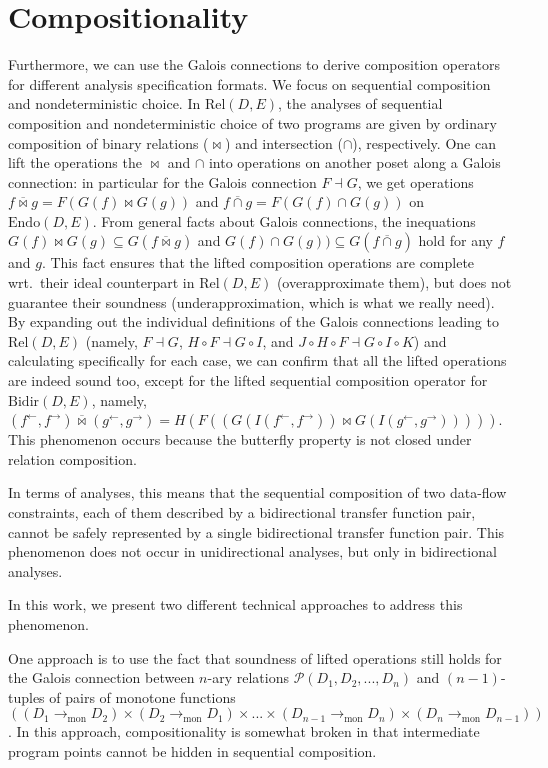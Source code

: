 \documentclass{easychair}
\theoremstyle{definition}
\newcommand{\Pow}{\mathcal{P}}
\newcommand{\Rel}{\mathrm{Rel}}
\newcommand{\Endo}{\mathrm{Endo}}
\newcommand{\Bidir}{\mathrm{Bidir}}
\newcommand{\tomon}{\to_{\mathrm{mon}}}
\newcommand{\ff}{{f^{\rightarrow}}}
\newcommand{\fb}{{f^{\leftarrow}}}
\newcommand{\gf}{{g^{\rightarrow}}}
\newcommand{\gb}{{g^{\leftarrow}}}
\newcommand{\comp}{\circ}
\newcommand{\bowtielift}{\mathbin{\overline{\bowtie}}}
\newcommand{\caplift}{\mathbin{\overline{\cap}}}
\begin{document}
\section{Compositionality}

Furthermore, we can use the Galois connections to derive composition operators for different analysis specification formats. We focus on sequential composition and nondeterministic choice. In $\Rel(D, E)$,
the analyses of sequential composition and nondeterministic choice of two programs are given by ordinary composition of binary relations ($\bowtie$) and intersection ($\cap$), respectively. One can lift the operations the $\bowtie$ and $\cap$
into operations on another poset along a Galois connection: in particular for the Galois connection $F \dashv G$, we get operations $f \bowtielift g = F (G(f) \bowtie G(g))$ and $f \caplift g = F(G (f) \cap G(g))$ on $\Endo(D,E)$.
From general facts about Galois connections, the inequations
$G(f) \bowtie G(g) \subseteq G (f \bowtielift g)$ and $G(f) \cap G(g)) \subseteq G(f \caplift g)$ hold for any $f$ and $g$.
This fact ensures that the lifted composition operations are complete wrt.\ their ideal counterpart in $\Rel(D, E)$ (overapproximate them), but does not guarantee their soundness (underapproximation, which is what we really need).
By expanding out the individual definitions of the Galois connections leading to $\Rel(D ,E)$ (namely, $F \dashv G$, $H \comp F \dashv G \comp I$, and $J \comp H \comp F \dashv G \comp I \comp K$) and calculating specifically for each case, we can confirm that all the lifted operations are indeed sound too, except for the lifted sequential composition operator for $\Bidir(D, E)$, namely, $(\fb , \ff) \bowtielift (\gb , \gf) = H(F((G(I(\fb , \ff)) \bowtie G(I(\gb , \gf)))))$. This phenomenon occurs because the butterfly property is not closed under relation composition.

In terms of analyses, this means that the sequential composition of two data-flow constraints, each of them described by a bidirectional transfer function pair, cannot be safely represented by a single bidirectional transfer function pair. This phenomenon does not occur in unidirectional analyses, but only in bidirectional analyses.

In this work, we present two different technical approaches to address this phenomenon.

One approach is to use the fact that soundness of lifted operations still holds for the Galois connection between $n$-ary relations $\Pow(D_{1}, D_{2}, ... , D_{n})$ and $(n-1)$-tuples of pairs of monotone functions $((D_{1} \tomon D_{2}) \times (D_{2} \tomon D_{1}) \times ... \times (D_{n-1} \tomon D_{n}) \times (D_{n} \tomon D_{n-1}))$. In this approach, compositionality is somewhat broken in that intermediate program points cannot be hidden in sequential composition. 
\end{document}
